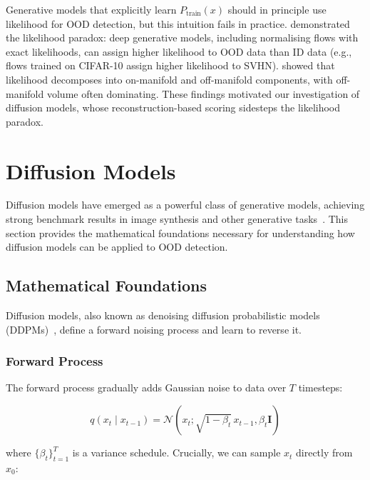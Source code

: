 Generative models that explicitly learn $P_{\text{train}}(x)$ should in principle use likelihood for OOD detection, but this intuition fails in practice. \textcite{nalisnick2019deep} demonstrated the likelihood paradox: deep generative models, including normalising flows with exact likelihoods, can assign higher likelihood to OOD data than ID data (e.g., flows trained on CIFAR-10 assign higher likelihood to SVHN). \textcite{kirichenko2020why} showed that likelihood decomposes into on-manifold and off-manifold components, with off-manifold volume often dominating. These findings motivated our investigation of diffusion models, whose reconstruction-based scoring sidesteps the likelihood paradox.


\section{Diffusion Models}
\label{sec:bg:diffusion}

Diffusion models have emerged as a powerful class of generative models, achieving strong benchmark results in image synthesis and other generative tasks~\cite{dhariwal2021diffusion, rombach2022highresolution}. This section provides the mathematical foundations necessary for understanding how diffusion models can be applied to OOD detection.

\subsection{Mathematical Foundations}
\label{sec:bg:diffusion:foundations}

Diffusion models, also known as denoising diffusion probabilistic models (DDPMs)~\cite{sohldickstein2015deep, ho2020denoising}, define a forward noising process and learn to reverse it.

\subsubsection{Forward Process}
\label{sec:bg:diffusion:forward}

The forward process gradually adds Gaussian noise to data over $T$ timesteps:

\begin{equation}
\label{eq:bg:forward1}
q(x_t \mid x_{t-1}) = \mathcal{N}(x_t; \sqrt{1 - \beta_t}\, x_{t-1}, \beta_t \mathbf{I})
\end{equation}

where $\{\beta_t\}_{t=1}^{T}$ is a variance schedule. Crucially, we can sample $x_t$ directly from $x_0$:

